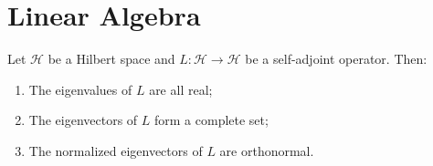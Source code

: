 \section{Linear Algebra}

\begin{theorem}
Let $\mathcal{H}$ be a Hilbert space and $L\colon \mathcal{H}\to\mathcal{H}$
be a self-adjoint operator. Then:
\begin{enumerate}
\item The eigenvalues of $L$ are all real;
\item The eigenvectors of $L$ form a complete set;
\item The normalized eigenvectors of $L$ are orthonormal.
\end{enumerate}
\end{theorem}
